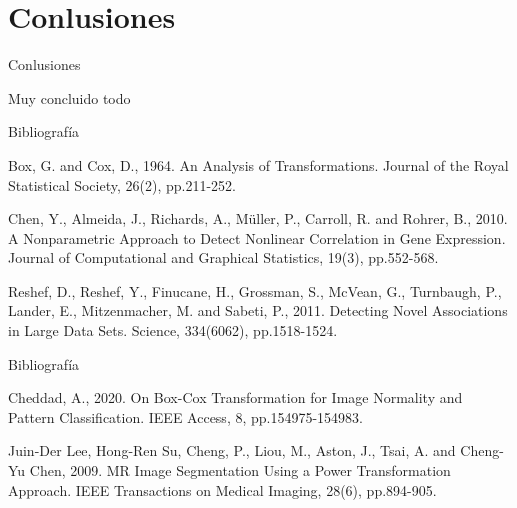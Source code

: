 \documentclass{beamer}
\begin{document}
\section{Conlusiones}

\begin{frame}{Conlusiones}
    
    Muy concluido todo
\end{frame}


\begin{frame}{Bibliografía}
    \begin{thebibliography}{9}
    Box, G. and Cox, D., 1964. An Analysis of Transformations. Journal of the Royal Statistical Society, 26(2), pp.211-252.
    
    Chen, Y., Almeida, J., Richards, A., Müller, P., Carroll, R. and Rohrer, B., 2010. A Nonparametric Approach to Detect Nonlinear Correlation in Gene Expression. Journal of Computational and Graphical Statistics, 19(3), pp.552-568.
    
    Reshef, D., Reshef, Y., Finucane, H., Grossman, S., McVean, G., Turnbaugh, P., Lander, E., Mitzenmacher, M. and Sabeti, P., 2011. Detecting Novel Associations in Large Data Sets. Science, 334(6062), pp.1518-1524.
    
    \end{thebibliography}
\end{frame}

\begin{frame}{Bibliografía}
    \begin{thebibliography}{9}
    Cheddad, A., 2020. On Box-Cox Transformation for Image Normality and Pattern Classification. IEEE Access, 8, pp.154975-154983.
    
    Juin-Der Lee, Hong-Ren Su, Cheng, P., Liou, M., Aston, J., Tsai, A. and Cheng-Yu Chen, 2009. MR Image Segmentation Using a Power Transformation Approach. IEEE Transactions on Medical Imaging, 28(6), pp.894-905.
    
    \end{thebibliography}
\end{frame}
\end{document}
